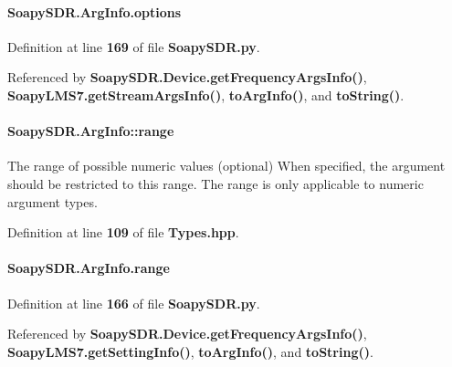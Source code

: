 \paragraph[{options}]{\setlength{\rightskip}{0pt plus 5cm}Soapy\+S\+D\+R.\+Arg\+Info.\+options\hspace{0.3cm}{\ttfamily [static]}}\label{classSoapySDR_1_1ArgInfo_a05e1b02cf2eac1be7fc70cc6c34a49b1}


Definition at line {\bf 169} of file {\bf Soapy\+S\+D\+R.\+py}.



Referenced by {\bf Soapy\+S\+D\+R.\+Device.\+get\+Frequency\+Args\+Info()}, {\bf Soapy\+L\+M\+S7.\+get\+Stream\+Args\+Info()}, {\bf to\+Arg\+Info()}, and {\bf to\+String()}.

\paragraph[{range}]{ Soapy\+S\+D\+R.\+Arg\+Info\+::range}\label{classSoapySDR_1_1ArgInfo_a51e4c8bb2094f64d1fc600e7f99320c9}
The range of possible numeric values (optional) When specified, the argument should be restricted to this range. The range is only applicable to numeric argument types. 

Definition at line {\bf 109} of file {\bf Types.\+hpp}.

\paragraph[{range}]{\setlength{\rightskip}{0pt plus 5cm}Soapy\+S\+D\+R.\+Arg\+Info.\+range\hspace{0.3cm}{\ttfamily [static]}}\label{classSoapySDR_1_1ArgInfo_aabd69135a4970705266e0221de4d46a1}


Definition at line {\bf 166} of file {\bf Soapy\+S\+D\+R.\+py}.



Referenced by {\bf Soapy\+S\+D\+R.\+Device.\+get\+Frequency\+Args\+Info()}, {\bf Soapy\+L\+M\+S7.\+get\+Setting\+Info()}, {\bf to\+Arg\+Info()}, and {\bf to\+String()}.

